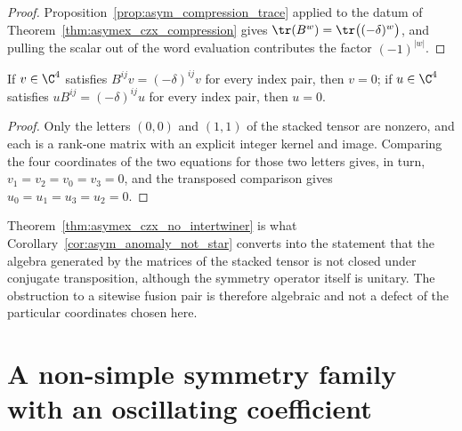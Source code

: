 \begin{proof}
    \leanok
    Proposition~\ref{prop:asym_compression_trace} applied to the datum of
    Theorem~\ref{thm:asymex_czx_compression} gives
    $\tr(B^w)=\tr\bigl((-\delta)^w\bigr)$, and pulling the scalar out of the
    word evaluation contributes the factor $(-1)^{|w|}$.
\end{proof}

\begin{theorem}
    \label{thm:asymex_czx_no_intertwiner}
    \leanok
    If $v\in\C^4$ satisfies $B^{ij}v=(-\delta)^{ij}v$ for every index pair,
    then $v=0$; if $u\in\C^4$ satisfies $uB^{ij}=(-\delta)^{ij}u$ for every
    index pair, then $u=0$.
\end{theorem}

\begin{proof}
    \leanok
    Only the letters $(0,0)$ and $(1,1)$ of the stacked tensor are nonzero,
    and each is a rank-one matrix with an explicit integer kernel and image.
    Comparing the four coordinates of the two equations for those two
    letters gives, in turn, $v_1=v_2=v_0=v_3=0$, and the transposed
    comparison gives $u_0=u_1=u_3=u_2=0$.
\end{proof}

\begin{remark}
    \label{rem:asymex_czx_anomaly}
    Theorem~\ref{thm:asymex_czx_no_intertwiner} is what
    Corollary~\ref{cor:asym_anomaly_not_star} converts into the statement
    that the algebra generated by the matrices of the stacked tensor is not
    closed under conjugate transposition, although the symmetry operator
    itself is unitary. The obstruction to a sitewise fusion pair is
    therefore algebraic and not a defect of the particular coordinates
    chosen here.
\end{remark}

\section{A non-simple symmetry family with an oscillating coefficient}%
\label{sec:asymex_czx_plus}

